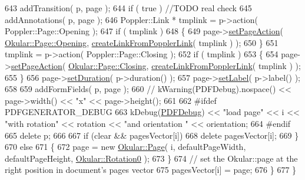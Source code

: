 \begin{DoxyCode}
643             addTransition( p, page );
644             \textcolor{keywordflow}{if} ( \textcolor{keyword}{true} ) \textcolor{comment}{//TODO real check}
645             addAnnotations( p, page );
646             Poppler::Link * tmplink = p->action( Poppler::Page::Opening );
647             \textcolor{keywordflow}{if} ( tmplink )
648             \{
649                 page->\hyperlink{classOkular_1_1Page_add2a5b0b8218d36229a208f85b9904db}{setPageAction}( \hyperlink{classOkular_1_1Page_a6a8e241cdb604d5c90d5f80b169788f7adbcb6b79c0b2118ed23a0d1c89391f87}{Okular::Page::Opening}, 
      \hyperlink{generator__pdf_8cpp_ac8496a01bf2593a90b5063709cff7d99}{createLinkFromPopplerLink}( tmplink ) );
650             \}
651             tmplink = p->action( Poppler::Page::Closing );
652             \textcolor{keywordflow}{if} ( tmplink )
653             \{
654                 page->\hyperlink{classOkular_1_1Page_add2a5b0b8218d36229a208f85b9904db}{setPageAction}( \hyperlink{classOkular_1_1Page_a6a8e241cdb604d5c90d5f80b169788f7ae9b42d3ddb97cc7f889104c73c686f80}{Okular::Page::Closing}, 
      \hyperlink{generator__pdf_8cpp_ac8496a01bf2593a90b5063709cff7d99}{createLinkFromPopplerLink}( tmplink ) );
655             \}
656             page->\hyperlink{classOkular_1_1Page_aed91ead8670fb0784a95e949804945f8}{setDuration}( p->duration() );
657             page->\hyperlink{classOkular_1_1Page_ab81a90b1fb9d3b52f5df5c2b26ceca27}{setLabel}( p->label() );
658 
659             addFormFields( p, page );
660 \textcolor{comment}{//        kWarning(PDFDebug).nospace() << page->width() << "x" << page->height();}
661 
662 \textcolor{preprocessor}{#ifdef PDFGENERATOR\_DEBUG}
663             kDebug(\hyperlink{classPDFGenerator_ab548883f17326b0a73d3a1b07cae0f8d}{PDFDebug}) << \textcolor{stringliteral}{"load page"} << i << \textcolor{stringliteral}{"with rotation"} << rotation << \textcolor{stringliteral}{"and orientation
      "} << orientation;
664 \textcolor{preprocessor}{#endif}
665             \textcolor{keyword}{delete} p;
666 
667             \textcolor{keywordflow}{if} (clear && pagesVector[i])
668                 \textcolor{keyword}{delete} pagesVector[i];
669         \}
670         \textcolor{keywordflow}{else}
671         \{
672             page = \textcolor{keyword}{new} \hyperlink{classOkular_1_1Page}{Okular::Page}( i, defaultPageWidth, defaultPageHeight, 
      \hyperlink{namespaceOkular_a8556d00465f61ef533c6b027669e7da6aa4df8fc3dd09e30520c264c8d23d89c2}{Okular::Rotation0} );
673         \}
674         \textcolor{comment}{// set the Okular::page at the right position in document's pages vector}
675         pagesVector[i] = page;
676     \}
677 \}
\end{DoxyCode}
